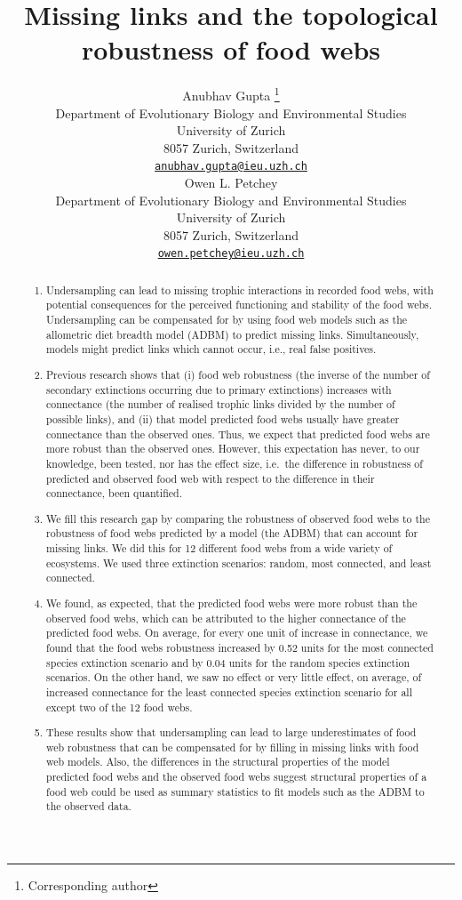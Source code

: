 \documentclass{article}
\title{Missing links and the topological robustness of food webs}
\author{
    Anubhav Gupta
    \thanks{Corresponding author}
   \\
    Department of Evolutionary Biology and Environmental Studies \\
    University of Zurich \\
  8057 Zurich, Switzerland \\
  \texttt{\href{mailto:anubhav.gupta@ieu.uzh.ch}{\nolinkurl{anubhav.gupta@ieu.uzh.ch}}} \\
   \And
    Owen L. Petchey
   \\
    Department of Evolutionary Biology and Environmental Studies \\
    University of Zurich \\
  8057 Zurich, Switzerland \\
  \texttt{\href{mailto:owen.petchey@ieu.uzh.ch}{\nolinkurl{owen.petchey@ieu.uzh.ch}}} \\
  }
\providecommand{\tightlist}{%
  \setlength{\itemsep}{0pt}\setlength{\parskip}{0pt}}
\begin{document}
\maketitle


\begin{abstract}
\begin{enumerate}
\def\labelenumi{\arabic{enumi})}
\tightlist
\item
  Undersampling can lead to missing trophic interactions in recorded
  food webs, with potential consequences for the perceived functioning
  and stability of the food webs. Undersampling can be compensated for
  by using food web models such as the allometric diet breadth model
  (ADBM) to predict missing links. Simultaneously, models might predict
  links which cannot occur, i.e., real false positives.
\item
  Previous research shows that (i) food web robustness (the inverse of
  the number of secondary extinctions occurring due to primary
  extinctions) increases with connectance (the number of realised
  trophic links divided by the number of possible links), and (ii) that
  model predicted food webs usually have greater connectance than the
  observed ones. Thus, we expect that predicted food webs are more
  robust than the observed ones. However, this expectation has never, to
  our knowledge, been tested, nor has the effect size, i.e.~the
  difference in robustness of predicted and observed food web with
  respect to the difference in their connectance, been quantified.
\item
  We fill this research gap by comparing the robustness of observed food
  webs to the robustness of food webs predicted by a model (the ADBM)
  that can account for missing links. We did this for 12 different food
  webs from a wide variety of ecosystems. We used three extinction
  scenarios: random, most connected, and least connected.
\item
  We found, as expected, that the predicted food webs were more robust
  than the observed food webs, which can be attributed to the higher
  connectance of the predicted food webs. On average, for every one unit
  of increase in connectance, we found that the food webs robustness
  increased by 0.52 units for the most connected species extinction
  scenario and by 0.04 units for the random species extinction
  scenarios. On the other hand, we saw no effect or very little effect,
  on average, of increased connectance for the least connected species
  extinction scenario for all except two of the 12 food webs.
\item
  These results show that undersampling can lead to large underestimates
  of food web robustness that can be compensated for by filling in
  missing links with food web models. Also, the differences in the
  structural properties of the model predicted food webs and the
  observed food webs suggest structural properties of a food web could
  be used as summary statistics to fit models such as the ADBM to the
  observed data.
\end{enumerate}
\end{abstract}
\end{document}
